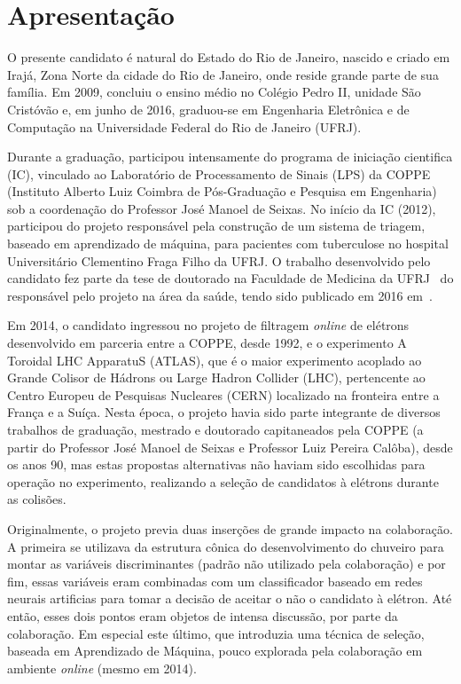 


\section{Apresentação}\label{sec:apresentation}

O presente candidato é natural do Estado do Rio de Janeiro, nascido 
e criado em Irajá, Zona Norte da cidade do Rio de Janeiro, onde 
reside grande parte de sua família. Em 2009, concluiu o ensino médio no 
Colégio Pedro II, unidade São Cristóvão e, em junho de 2016, graduou-se em Engenharia 
Eletrônica e de Computação na Universidade Federal do Rio de Janeiro (UFRJ).



Durante a graduação, participou intensamente do programa de iniciação 
cientifica (IC), vinculado ao Laboratório de Processamento de Sinais (LPS) da 
COPPE (Instituto Alberto Luiz Coimbra de Pós-Graduação e Pesquisa em Engenharia) 
sob a coordenação do Professor José Manoel de Seixas. No início da IC (2012), participou 
do projeto responsável pela construção de um sistema de triagem, baseado em aprendizado de 
máquina, para pacientes com tuberculose no hospital Universitário Clementino Fraga Filho da UFRJ. 
O trabalho desenvolvido pelo candidato fez parte da tese de doutorado na Faculdade
de Medicina da UFRJ~\cite{tese_fabio_aguiar} do responsável pelo projeto na área da saúde, 
tendo sido publicado em 2016 em~\cite{paper_tb_som}. 

Em 2014, o candidato ingressou no projeto de filtragem \emph{online} de elétrons 
desenvolvido em parceria entre a COPPE, desde 1992, e o experimento A Toroidal LHC 
ApparatuS (ATLAS), que é o maior experimento acoplado ao Grande Colisor de Hádrons ou 
Large Hadron Collider (LHC), pertencente ao Centro Europeu de Pesquisas Nucleares (CERN) 
localizado na fronteira entre a França e a Suíça. Nesta época, o projeto havia sido parte 
integrante de diversos trabalhos de graduação, mestrado e doutorado capitaneados pela 
COPPE (a partir do Professor José Manoel de Seixas e Professor Luiz Pereira Calôba), desde 
os anos 90, mas estas propostas alternativas não haviam sido escolhidas para operação no 
experimento, realizando a seleção de candidatos à elétrons durante as colisões. 



Originalmente, o projeto previa duas inserções de grande impacto na colaboração. 
A primeira se utilizava da estrutura cônica do desenvolvimento do chuveiro para montar 
as variáveis discriminantes (padrão não utilizado pela colaboração) e por fim, essas 
variáveis eram combinadas com um classificador baseado em redes neurais artificias para 
tomar a decisão de aceitar o não o candidato à elétron. Até então, esses dois pontos eram 
objetos de intensa discussão, por parte da colaboração. Em especial este último, que 
introduzia uma técnica de seleção, baseada em Aprendizado de Máquina, pouco explorada pela 
colaboração em ambiente \emph{online} (mesmo em 2014). 



